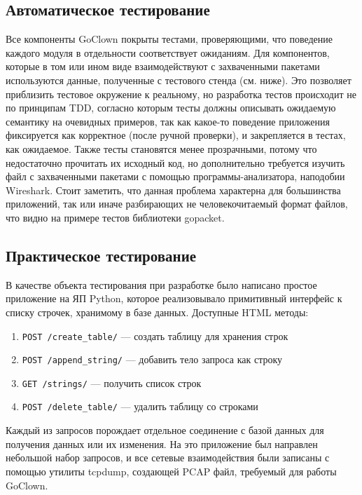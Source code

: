 \subsection{Автоматическое тестирование}
Все компоненты GoClown покрыты тестами, проверяющими, что поведение каждого
модуля в отдельности соответствует ожиданиям. Для компонентов, которые
в том или ином виде взаимодействуют с захваченными пакетами используются
данные, полученные с тестового стенда (см. ниже). Это позволяет приблизить
тестовое окружение к реальному, но разработка тестов происходит не по принципам
TDD, согласно которым тесты должны описывать ожидаемую семантику на очевидных
примеров, так как какое-то поведение приложения фиксируется как корректное
(после ручной проверки), и закрепляется в тестах, как ожидаемое. Также тесты
становятся менее прозрачными, потому что недостаточно прочитать их исходный код,
но дополнительно требуется изучить файл с захваченными пакетами с помощью
программы-анализатора, наподобии Wireshark. Стоит заметить, что данная проблема
характерна для большинства приложений, так или иначе разбирающих не
человекочитаемый формат файлов, что видно на примере тестов библиотеки
gopacket.

\subsection{Практическое тестирование}
В качестве объекта тестирования при разработке было написано простое приложение
на ЯП Python, которое реализовывало примитивный интерфейс к списку строчек,
хранимому в базе данных.
Доступные HTML методы:
\begin{enumerate}
\item \lstinline{POST /create_table/} --- создать таблицу для хранения строк  
\item \lstinline{POST /append_string/} --- добавить тело запроса как строку  
\item \lstinline{GET /strings/} --- получить список строк  
\item \lstinline{POST /delete_table/} --- удалить таблицу со строками  
\end{enumerate}
Каждый из запросов порождает отдельное соединение с базой данных для получения
данных или их изменения.
На это приложение был направлен небольшой набор запросов, и все сетевые
взаимодействия были записаны с помощью утилиты tcpdump, создающей PCAP файл,
требуемый для работы GoClown.

